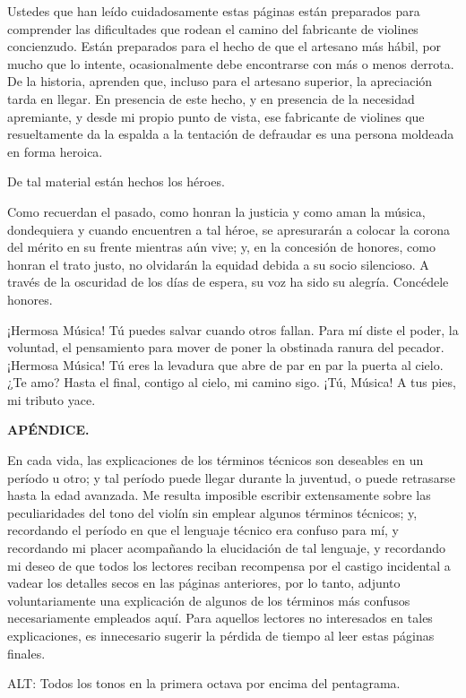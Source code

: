 \documentclass[12pt]{book}
\begin{document}
Ustedes que han leído cuidadosamente estas páginas están preparados para comprender las dificultades que rodean el camino del fabricante de violines concienzudo. Están preparados para el hecho de que el artesano más hábil, por mucho que lo intente, ocasionalmente debe encontrarse con más o menos derrota. De la historia, aprenden que, incluso para el artesano superior, la apreciación tarda en llegar. En presencia de este hecho, y en presencia de la necesidad apremiante, y desde mi propio punto de vista, ese fabricante de violines que resueltamente da la espalda a la tentación de defraudar es una persona moldeada en forma heroica.

De tal material están hechos los héroes.

Como recuerdan el pasado, como honran la justicia y como aman la música, dondequiera y cuando encuentren a tal héroe, se apresurarán a colocar la corona del mérito en su frente mientras aún vive; y, en la concesión de honores, como honran el trato justo, no olvidarán la equidad debida a su socio silencioso. A través de la oscuridad de los días de espera, su voz ha sido su alegría. Concédele honores.

¡Hermosa Música! Tú puedes salvar cuando otros fallan. Para mí diste el poder, la voluntad, el pensamiento para mover de poner la obstinada ranura del pecador. ¡Hermosa Música! Tú eres la levadura que abre de par en par la puerta al cielo. ¿Te amo? Hasta el final, contigo al cielo, mi camino sigo. ¡Tú, Música! A tus pies, mi tributo yace.

\textbf{APÉNDICE.}

En cada vida, las explicaciones de los términos técnicos son deseables en un período u otro; y tal período puede llegar durante la juventud, o puede retrasarse hasta la edad avanzada. Me resulta imposible escribir extensamente sobre las peculiaridades del tono del violín sin emplear algunos términos técnicos; y, recordando el período en que el lenguaje técnico era confuso para mí, y recordando mi placer acompañando la elucidación de tal lenguaje, y recordando mi deseo de que todos los lectores reciban recompensa por el castigo incidental a vadear los detalles secos en las páginas anteriores, por lo tanto, adjunto voluntariamente una explicación de algunos de los términos más confusos necesariamente empleados aquí. Para aquellos lectores no interesados en tales explicaciones, es innecesario sugerir la pérdida de tiempo al leer estas páginas finales.

ALT: Todos los tonos en la primera octava por encima del pentagrama.
\end{document}
